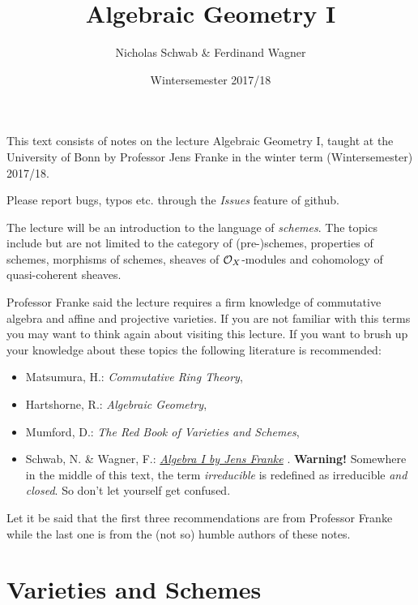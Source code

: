 \documentclass[a4paper,parskip=half,numbers=enddot, DIV=12]{scrreprt}
\title{Algebraic Geometry I}
\author{Nicholas Schwab \& Ferdinand Wagner}
\date{Wintersemester 2017/18}
\begin{document}
\maketitle
{}

\thispagestyle{plain}
This text consists of notes on the lecture Algebraic Geometry I, taught at the University of Bonn by Professor Jens Franke in the winter term (Wintersemester) 2017/18. 

Please report bugs, typos etc. through the \emph{Issues} feature of github.

\tableofcontents

The lecture will be an introduction to the language of \emph{schemes}. The topics include but are not limited to the category of (pre-)schemes, properties of schemes, morphisms of schemes, sheaves of $\mathcal{O}_X$-modules and cohomology of quasi-coherent sheaves.

Professor Franke said the lecture requires a firm knowledge of commutative algebra and affine and projective varieties. If you are not familiar with this terms you may want to think again about visiting this lecture. If you want to brush up your knowledge about these topics the following literature is recommended:
\begin{itemize}
 \item Matsumura, H.: \emph{Commutative Ring Theory},
 \item Hartshorne, R.: \emph{Algebraic Geometry},
 \item Mumford, D.: \emph{The Red Book of Varieties and Schemes},
 \item Schwab, N. \& Wagner, F.: \href{https://github.com/Nicholas42/AlgebraFranke/tree/master/AlgebraI}{\emph{Algebra I by Jens Franke}} \cite{alg1}. \textbf{Warning!} Somewhere in the middle of this text, the term \emph{irreducible} is redefined as irreducible \emph{and closed}. So don't let yourself get confused.
\end{itemize}
Let it be said that the first three recommendations are from Professor Franke while the last one is from the (not so) humble authors of these notes.

\chapter{Varieties and Schemes}
\end{document}
